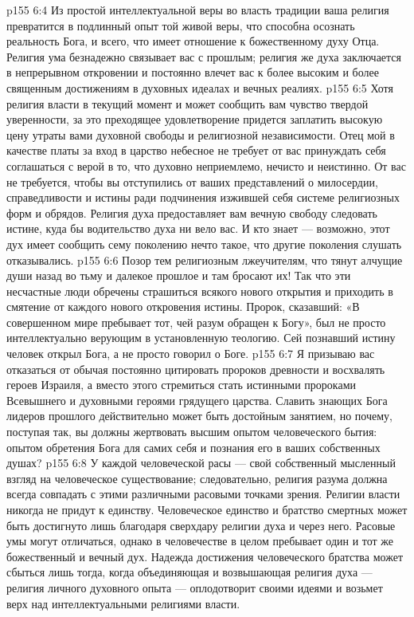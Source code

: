 \vs p155 6:4 Из простой интеллектуальной веры во власть традиции ваша религия превратится в подлинный опыт той живой веры, что способна осознать реальность Бога, и всего, что имеет отношение к божественному духу Отца. Религия ума безнадежно связывает вас с прошлым; религия же духа заключается в непрерывном откровении и постоянно влечет вас к более высоким и более священным достижениям в духовных идеалах и вечных реалиях.
\vs p155 6:5 Хотя религия власти в текущий момент и может сообщить вам чувство твердой уверенности, за это преходящее удовлетворение придется заплатить высокую цену утраты вами духовной свободы и религиозной независимости. Отец мой в качестве платы за вход в царство небесное не требует от вас принуждать себя соглашаться с верой в то, что духовно неприемлемо, нечисто и неистинно. От вас не требуется, чтобы вы отступились от ваших представлений о милосердии, справедливости и истины ради подчинения изжившей себя системе религиозных форм и обрядов. Религия духа предоставляет вам вечную свободу следовать истине, куда бы водительство духа ни вело вас. И кто знает --- возможно, этот дух имеет сообщить сему поколению нечто такое, что другие поколения слушать отказывались.
\vs p155 6:6 Позор тем религиозным лжеучителям, что тянут алчущие души назад во тьму и далекое прошлое и там бросают их! Так что эти несчастные люди обречены страшиться всякого нового открытия и приходить в смятение от каждого нового откровения истины. Пророк, сказавший: «В совершенном мире пребывает тот, чей разум обращен к Богу», был не просто интеллектуально верующим в установленную теологию. Сей познавший истину человек открыл Бога, а не просто говорил о Боге.
\vs p155 6:7 Я призываю вас отказаться от обычая постоянно цитировать пророков древности и восхвалять героев Израиля, а вместо этого стремиться стать истинными пророками Всевышнего и духовными героями грядущего царства. Славить знающих Бога лидеров прошлого действительно может быть достойным занятием, но почему, поступая так, вы должны жертвовать высшим опытом человеческого бытия: опытом обретения Бога для самих себя и познания его в ваших собственных душах?
\vs p155 6:8 У каждой человеческой расы --- свой собственный мысленный взгляд на человеческое существование; следовательно, религия разума должна всегда совпадать с этими различными расовыми точками зрения. Религии власти никогда не придут к единству. Человеческое единство и братство смертных может быть достигнуто лишь благодаря сверхдару религии духа и через него. Расовые умы могут отличаться, однако в человечестве в целом пребывает один и тот же божественный и вечный дух. Надежда достижения человеческого братства может сбыться лишь тогда, когда объединяющая и возвышающая религия духа --- религия личного духовного опыта --- оплодотворит своими идеями и возьмет верх над интеллектуальными религиями власти.
